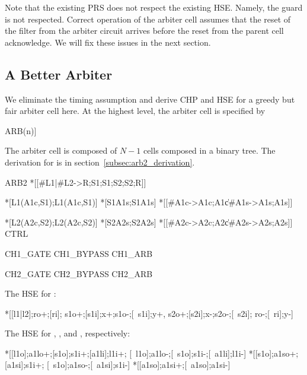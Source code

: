 \documentclass[aer.tex]{subfiles}
\begin{document}
Note that the existing PRS does not respect the existing HSE. 
Namely, the \code{[$\neg$a1i]} guard is not respected.
Correct operation of the arbiter cell assumes that the reset of the filter 
from the arbiter circuit arrives before the reset from the parent cell acknowledge.
We will fix these issues in the next section.

\subsection{A Better Arbiter}
\label{subsec:arb2}

We eliminate the timing assumption and derive CHP and HSE for a greedy but fair arbiter cell here.
At the highest level, the arbiter cell is specified by

\begin{csp}
ARB(n)\equiv*[[\langle\|i:1..n:#{Li}->Li;Li\rangle]]
\end{csp}

The arbiter cell is composed of $N-1$  cells composed in a binary tree.
The derivation for  is in section~\ref{subsec:arb2_derivation}.

\begin{csp}
ARB2\equiv
  *[[#{L1}|#{L2}->R;S1;S1;S2;S2;R]]

  *[L1\star(A1c,S1);L1\star(A1c,S1)]
  *[S1\star\!A1s;S1\star\!A1s]
  *[[#{A1c}->A1c;A1c\|#{A1s}->A1s;A1s]]
  
  *[L2\star(A2c,S2);L2\star(A2c,S2)]
  *[S2\star\!A2s;S2\star\!A2s]
  *[[#{A2c}->A2c;A2c\|#{A2s}->A2s;A2s]]
\equiv
  CTRL 
 
  CH1_GATE
  CH1_BYPASS
  CH1_ARB
 
  CH2_GATE
  CH2_BYPASS
  CH2_ARB 
\end{csp}

\noindent The HSE for :

\begin{hse}
  *[[l1|l2];ro+;[ri];
    s1o+;[s1i];x+;s1o-;[~s1i];y+,
    s2o+;[s2i];x-;s2o-;[~s2i];
    ro-;[~ri];y-]
\end{hse}

\noindent The HSE for , , and , respectively:

\begin{hse}
  *[[l1o];a1lo+;[s1o];s1i+;[a1li];l1i+;
    [~l1o];a1lo-;[~s1o];s1i-;[~a1li];l1i-]
  *[[s1o];a1so+;[a1si];s1i+;
    [~s1o];a1so-;[~a1si];s1i-]
  *[[a1so];a1si+;[~a1so];a1si-]
\end{hse}
\end{document}
